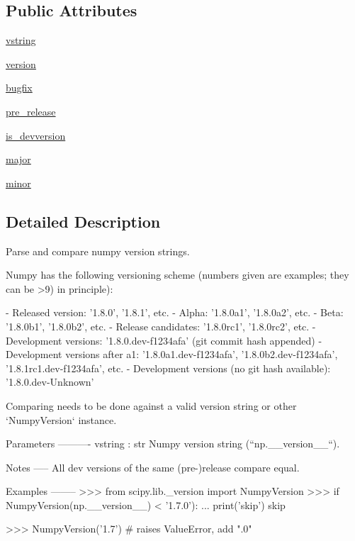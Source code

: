 \subsection*{Public Attributes}
\begin{DoxyCompactItemize}
\item 
\hyperlink{classscipy_1_1lib_1_1__version_1_1NumpyVersion_a03d9c58eea51a0c21d0c49058388047a}{vstring}
\item 
\hyperlink{classscipy_1_1lib_1_1__version_1_1NumpyVersion_a8630787243493374a9995f1b0193a42d}{version}
\item 
\hyperlink{classscipy_1_1lib_1_1__version_1_1NumpyVersion_a39182e57e74bdaed63d36321c60b733a}{bugfix}
\item 
\hyperlink{classscipy_1_1lib_1_1__version_1_1NumpyVersion_afcdc02faf7b614a614eed44516564adf}{pre\+\_\+release}
\item 
\hyperlink{classscipy_1_1lib_1_1__version_1_1NumpyVersion_a5cdf6c59231dd5def55439f81bbd3686}{is\+\_\+devversion}
\item 
\hyperlink{classscipy_1_1lib_1_1__version_1_1NumpyVersion_a11d816abfe2c1ec464fffefdc8e4d27b}{major}
\item 
\hyperlink{classscipy_1_1lib_1_1__version_1_1NumpyVersion_a072289ce637e8c22ad13d8ae488659a5}{minor}
\end{DoxyCompactItemize}


\subsection{Detailed Description}
\begin{DoxyVerb}Parse and compare numpy version strings.

Numpy has the following versioning scheme (numbers given are examples; they
can be >9) in principle):

- Released version: '1.8.0', '1.8.1', etc.
- Alpha: '1.8.0a1', '1.8.0a2', etc.
- Beta: '1.8.0b1', '1.8.0b2', etc.
- Release candidates: '1.8.0rc1', '1.8.0rc2', etc.
- Development versions: '1.8.0.dev-f1234afa' (git commit hash appended)
- Development versions after a1: '1.8.0a1.dev-f1234afa',
                                 '1.8.0b2.dev-f1234afa',
                                 '1.8.1rc1.dev-f1234afa', etc.
- Development versions (no git hash available): '1.8.0.dev-Unknown'

Comparing needs to be done against a valid version string or other
`NumpyVersion` instance.

Parameters
----------
vstring : str
    Numpy version string (``np.__version__``).

Notes
-----
All dev versions of the same (pre-)release compare equal.

Examples
--------
>>> from scipy.lib._version import NumpyVersion
>>> if NumpyVersion(np.__version__) < '1.7.0'):
...     print('skip')
skip

>>> NumpyVersion('1.7')  # raises ValueError, add ".0"\end{DoxyVerb}
 

